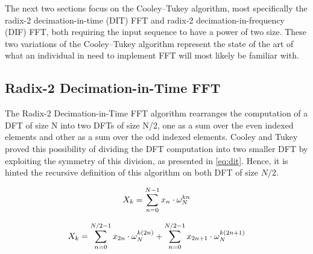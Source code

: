 \documentclass[
  oneside,
  11pt, a4paper,
  footinclude=true,
  headinclude=true,
  cleardoublepage=empty
]{scrbook}
\begin{document}

The next two sections focus on the Cooley–Tukey algorithm, most specifically the radix-2 decimation-in-time (DIT) FFT and radix-2 decimation-in-frequency (DIF) FFT, both requiring the input sequence to have a power of two size. These two variations of the Cooley–Tukey algorithm represent the state of the art of what an individual in need to implement FFT will most likely be familiar with.


\subsection{Radix-2 Decimation-in-Time FFT} \label{subsec:radix-2-decimation-in-time-fft}



The Radix-2 Decimation-in-Time FFT algorithm rearranges the computation of a DFT of size N into two DFTs of size N/2, one as a sum over the even indexed elements and other as a sum over the odd indexed elements. Cooley and Tukey proved this possibility of dividing the DFT computation into two smaller DFT by exploiting the symmetry of this division, as presented in \autoref{eq:dit}. Hence, it is hinted the recursive definition of this algorithm on both DFT of size \(N/2\).

\begin{equation*}
    X_{k} = \sum_{n=0}^{N-1}x_{n} \cdot \omega_{N}^{kn} \\
\end{equation*}


\begin{equation*}
    X_{k} = \sum_{n=0}^{N/2-1}x_{2n} \cdot \omega_{N}^{k(2n)} + \sum_{n=0}^{N/2-1}x_{2n+1} \cdot \omega_{N}^{k(2n+1)} \\
\end{equation*}
\end{document}
